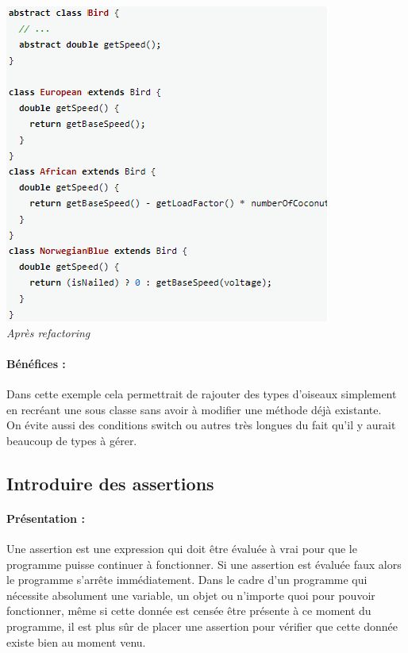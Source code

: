 \documentclass[a4paper,twoside,12pt,openright]{report}
\begin{document}
\begin{center}
\includegraphics[scale=1]{Image/ReplaceConditionalPoly2.png}\\
\itshape{Après refactoring \cite{ref5}}
\end{center}

\paragraph{Bénéfices :}
Dans cette exemple cela permettrait de rajouter des types d'oiseaux simplement en recréant une sous classe sans avoir à modifier une méthode déjà existante.\\
On évite aussi des conditions switch ou autres très longues du fait qu'il y aurait beaucoup de types à gérer.\\

\newpage

\subsection{Introduire des assertions}
\paragraph{Présentation :}
Une assertion est une expression qui doit être évaluée à vrai pour que le programme puisse continuer à fonctionner. Si une assertion est évaluée faux alors le programme s'arrête immédiatement.
Dans le cadre d'un programme qui nécessite absolument une variable, un objet ou n'importe quoi pour pouvoir fonctionner, même si cette donnée est censée être présente à ce moment du programme, il est plus sûr de placer une assertion pour vérifier que cette donnée existe bien au moment venu.
\end{document}
